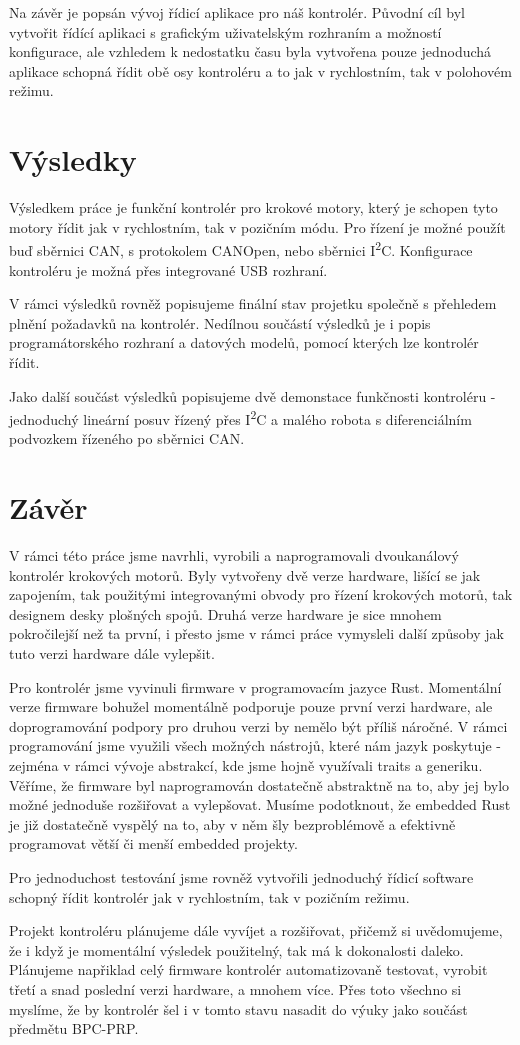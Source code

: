 Na závěr je popsán vývoj řídicí aplikace pro náš kontrolér.
Původní cíl byl vytvořit řídící aplikaci s grafickým uživatelským rozhraním a možností konfigurace, ale vzhledem k nedostatku času byla vytvořena pouze jednoduchá aplikace schopná řídit obě osy kontroléru a to jak v rychlostním, tak v polohovém režimu.

\section*{Výsledky}
Výsledkem práce je funkční kontrolér pro krokové motory, který je schopen tyto motory řídit jak v rychlostním, tak v pozičním módu.
Pro řízení je možné použít buď sběrnici CAN, s protokolem CANOpen, nebo sběrnici I\textsuperscript{2}C.
Konfigurace kontroléru je možná přes integrované USB rozhraní.

V rámci výsledků rovněž popisujeme finální stav projetku společně s přehledem plnění požadavků na kontrolér.
Nedílnou součástí výsledků je i popis programátorského rozhraní a datových modelů, pomocí kterých lze kontrolér řídit.

Jako další součást výsledků popisujeme dvě demonstace funkčnosti kontroléru - jednoduchý lineární posuv řízený přes I\textsuperscript{2}C a malého robota s diferenciálním podvozkem řízeného po sběrnici CAN.

\section*{Závěr}
V rámci této práce jsme navrhli, vyrobili a naprogramovali dvoukanálový kontrolér krokových motorů.
Byly vytvořeny dvě verze hardware, lišící se jak zapojením, tak použitými integrovanými obvody pro řízení krokových motorů, tak designem desky plošných spojů.
Druhá verze hardware je sice mnohem pokročilejší než ta první, i přesto jsme v rámci práce vymysleli další způsoby jak tuto verzi hardware dále vylepšit.

Pro kontrolér jsme vyvinuli firmware v programovacím jazyce Rust.
Momentální verze firmware bohužel momentálně podporuje pouze první verzi hardware, ale doprogramování podpory pro druhou verzi by nemělo být příliš náročné.
V rámci programování jsme využili všech možných nástrojů, které nám jazyk poskytuje - zejména v rámci vývoje abstrakcí, kde jsme hojně využívali traits a generiku.
Věříme, že firmware byl naprogramován dostatečně abstraktně na to, aby jej bylo možné jednoduše rozšiřovat a vylepšovat.
Musíme podotknout, že embedded Rust je již dostatečně vyspělý na to, aby v něm šly bezproblémově a efektivně programovat větší či menší embedded projekty.

Pro jednoduchost testování jsme rovněž vytvořili jednoduchý řídicí software schopný řídit kontrolér jak v rychlostním, tak v pozičním režimu.

Projekt kontroléru plánujeme dále vyvíjet a rozšiřovat, přičemž si uvědomujeme, že i když je momentální výsledek použitelný, tak má k dokonalosti daleko.
Plánujeme napřiklad celý firmware kontrolér automatizovaně testovat, vyrobit třetí a snad poslední verzi hardware, a mnohem více.
Přes toto všechno si myslíme, že by kontrolér šel i v tomto stavu nasadit do výuky jako součást předmětu BPC-PRP.

